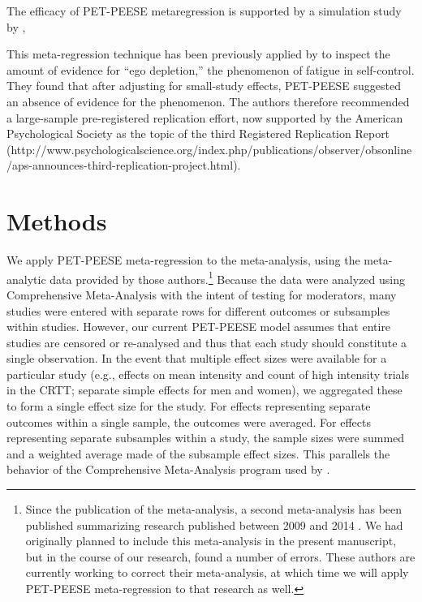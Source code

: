 \documentclass[man]{apa6}
\begin{document}
The efficacy of PET-PEESE metaregression is supported by a simulation study by \citet{Moreno:etal:2006}, 

This meta-regression technique has been previously applied by \citet{Carter:McCullough:2014} to inspect the amount of evidence for ``ego depletion,'' the phenomenon of fatigue in self-control. They found that after adjusting for small-study effects, PET-PEESE suggested an absence of evidence for the phenomenon. The authors therefore recommended a large-sample pre-registered replication effort, now supported by the American Psychological Society as the topic of the third Registered Replication Report (http://www.psychologicalscience.org/index.php/publications/observer/obsonline/aps-announces-third-replication-project.html).

\section{Methods}
We apply PET-PEESE meta-regression to the \citet{Anderson:etal:2010} meta-analysis, using the meta-analytic data provided by those authors.\footnote{Since the publication of the \citet{Anderson:etal:2010} meta-analysis, a second meta-analysis has been published summarizing research published between 2009 and 2014 \citet{Greitemeyer:Mugge:2014}. We had originally planned to include this meta-analysis in the present manuscript, but in the course of our research, found a number of errors. These authors are currently working to correct their meta-analysis, at which time we will apply PET-PEESE meta-regression to that research as well.} 
Because the data were analyzed using Comprehensive Meta-Analysis with the intent of testing for moderators, many studies were entered with separate rows for different outcomes or subsamples within studies. However, our current PET-PEESE model assumes that entire studies are censored or re-analysed and thus that each study should constitute a single observation. In the event that multiple effect sizes were available for a particular study (e.g., effects on mean intensity and count of high intensity trials in the CRTT; separate simple effects for men and women), we aggregated these to form a single effect size for the study. For effects representing separate outcomes within a single sample, the outcomes were averaged. For effects representing separate subsamples within a study, the sample sizes were summed and a weighted average made of the subsample effect sizes. This parallels the behavior of the Comprehensive Meta-Analysis program used by \citet{Anderson:etal:2010}.
\end{document}
